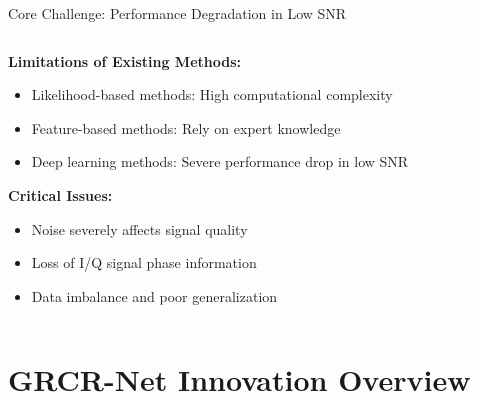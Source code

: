 \documentclass[aspectratio=169]{beamer}
\begin{document}
\begin{frame}{Core Challenge: Performance Degradation in Low SNR}
\begin{columns}
\begin{column}{0.5\textwidth}
\textbf{Limitations of Existing Methods:}
\begin{itemize}
\item Likelihood-based methods: High computational complexity
\item Feature-based methods: Rely on expert knowledge
\item Deep learning methods: Severe performance drop in low SNR
\end{itemize}

\vspace{0.5cm}
\textbf{Critical Issues:}
\begin{itemize}
\item Noise severely affects signal quality
\item Loss of I/Q signal phase information
\item Data imbalance and poor generalization
\end{itemize}
\end{column}
\begin{column}{0.5\textwidth}
\end{column}
\end{columns}
\end{frame}

\section{GRCR-Net Innovation Overview}
\end{document}
